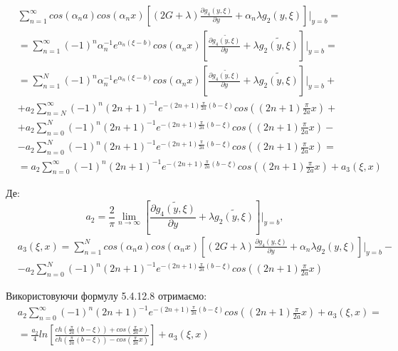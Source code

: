 \begin{align*}
    &\sum_{n=1}^{\infty} cos(\alpha_n a) cos(\alpha_n x) \left[(2G + \lambda) \frac{\partial g_4(y, \xi)}{\partial y} + \alpha_n \lambda g_2(y, \xi) \right]|_{y=b} = \\
    &= \sum_{n=1}^{\infty} (-1)^n \alpha_n^{-1} e^{\alpha_n (\xi - b)} cos(\alpha_n x) \left[ \frac{\partial \widetilde{g_4(y, \xi)}}{\partial y} + \lambda \widetilde{g_2(y, \xi)} \right]|_{y=b} = \\
    &= \sum_{n=1}^{N} (-1)^n \alpha_n^{-1} e^{\alpha_n (\xi - b)} cos(\alpha_n x) \left[ \frac{\partial \widetilde{g_4(y, \xi)}}{\partial y} + \lambda \widetilde{g_2(y, \xi)} \right]|_{y=b} + \\
    & + a_2 \sum_{n=N}^{\infty} (-1)^n (2n + 1)^{-1} e^{-(2n + 1) \frac{\pi}{2a} (b - \xi)} cos((2n + 1) \frac{\pi}{2a} x) + \\
    & + a_2 \sum_{n=0}^{N} (-1)^n (2n + 1)^{-1} e^{-(2n + 1) \frac{\pi}{2a} (b - \xi)} cos((2n + 1) \frac{\pi}{2a} x) - \\
    & - a_2 \sum_{n=0}^{N} (-1)^n (2n + 1)^{-1} e^{-(2n + 1) \frac{\pi}{2a} (b - \xi)} cos((2n + 1) \frac{\pi}{2a} x) = \\
    &= a_2 \sum_{n=0}^{\infty} (-1)^n (2n + 1)^{-1} e^{-(2n + 1) \frac{\pi}{2a} (b - \xi)} cos((2n + 1) \frac{\pi}{2a} x) + a_3(\xi, x)
\end{align*}

Де:
\begin{equation*}
    a_2 = \frac{2}{\pi} \lim_{n \rightarrow \infty}\left[ \frac{\partial \widetilde{g_4(y, \xi)}}{\partial y} + \lambda \widetilde{g_2(y, \xi)} \right]|_{y=b}, 
\end{equation*}
\begin{align*}
    &a_3(\xi, x) = \sum_{n=1}^{N} cos(\alpha_n a) cos(\alpha_n x) \left[(2G + \lambda) \frac{\partial g_4(y, \xi)}{\partial y} + \alpha_n \lambda g_2(y, \xi) \right]|_{y=b} - \\
    & - a_2 \sum_{n=0}^{N} (-1)^n (2n + 1)^{-1} e^{-(2n + 1) \frac{\pi}{2a} (b - \xi)} cos((2n + 1) \frac{\pi}{2a} x)
\end{align*}

Використовуючи формулу 5.4.12.8 \cite{prudnikov} отримаємо:
\begin{align*}
    &a_2 \sum_{n=0}^{\infty} (-1)^n (2n + 1)^{-1} e^{-(2n + 1) \frac{\pi}{2a} (b - \xi)} cos((2n + 1) \frac{\pi}{2a} x) + a_3(\xi, x) = \\
    &= \frac{a_2}{4} ln\left[ \frac{ch(\frac{\pi}{2a}(b - \xi)) + cos(\frac{\pi}{2a}x)}{ch(\frac{\pi}{2a}(b - \xi)) - cos(\frac{\pi}{2a}x)} \right] + a_3(\xi, x)
\end{align*}

